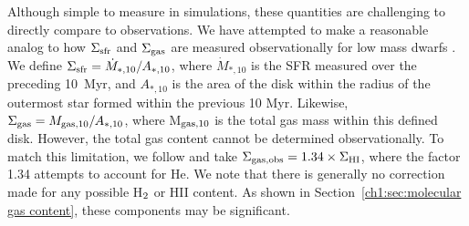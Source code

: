 Although simple to measure in simulations, these quantities are challenging to directly compare to observations. We have attempted to make a reasonable analog to how $\Sigma_{\rm sfr}$ and $\Sigma_{\rm gas}$ are measured observationally for low mass dwarfs \citep[see ][]{Roychowdhury2014}. We define $\Sigma_{\rm sfr} = \dot{M}_{*,10} / A_{*,10}$, where $\dot{M}_{*,10}$ is the SFR measured over the preceding 10~Myr, and $A_{*,10}$ is the area of the disk within the radius of the outermost star formed within the previous 10 Myr. Likewise, $\Sigma_{\rm gas} = M_{\rm gas,10} / A_{*,10}$, where M$_{\rm gas,10}$ is the total gas mass within this defined disk. However, the total gas content cannot be determined observationally. To match this limitation, we follow \cite{Roychowdhury2014} and take $\Sigma_{\rm gas, obs} = 1.34 \times \Sigma_{\rm HI}$, where the factor 1.34 attempts to account for He. We note that there is generally no correction made for any possible H$_{\rm 2}$ or HII content. As shown in Section~\ref{ch1:sec:molecular gas content}, these components may be significant.

